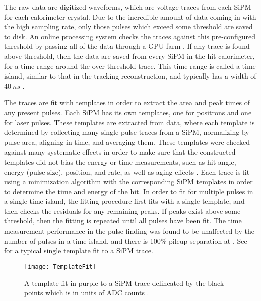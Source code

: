 The raw data are digitized waveforms, which are voltage traces from each SiPM for each calorimeter crystal. Due to the incredible amount of data coming in with the high sampling rate, only those pulses which exceed some threshold are saved to disk. An online processing system checks the traces against this pre-configured threshold by passing all of the data through a GPU farm \cite{Gohn:2016shi}. If any trace is found above threshold, then the data are saved from every SiPM in the hit calorimeter, for a time range around the over-threshold trace. This time range is called a time island, similar to that in the tracking reconstruction, and typically has a width of $\SI{40}{ns}$ \cite{AFThesis}.


The traces are fit with templates in order to extract the area and peak times of any present pulses. Each SiPM has its own templates, one for positrons and one for laser pulses. These templates are extracted from data, where each template is determined by collecting many single pulse traces from a SiPM, normalizing by pulse area, aligning in time, and averaging them. These templates were checked against many systematic effects in order to make sure that the constructed templates did not bias the energy or time measurements, such as hit angle, energy (pulse size), position, and rate, as well as aging effects \cite{Kaspar:2016ofv,AFThesis}. Each trace is fit using a \chisq minimization algorithm with the corresponding SiPM templates in order to determine the time and energy of the hit. In order to fit for multiple pulses in a single time island, the fitting procedure first fits with a single template, and then checks the residuals for any remaining peaks. If peaks exist above some threshold, then the fitting is repeated until all pulses have been fit. The time measurement performance in the pulse finding was found to be unaffected by the number of pulses in a time island, and there is 100\% pileup separation at . See  for a typical single template fit to a SiPM trace.


\begin{figure}
    \centering
    \texttt{[image: TemplateFit]}
    \caption[Template fit to SiPM trace]{A template fit in purple to a SiPM trace delineated by the black points which is in units of ADC counts \cite{AFThesis}.}
    \label{fig:TemplateFit}
\end{figure}



